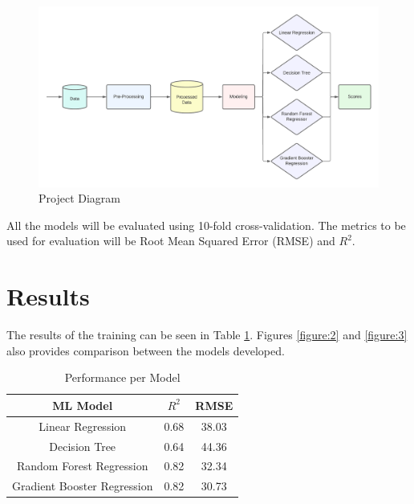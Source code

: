 \documentclass{article}
\begin{document}
\begin{figure}[h]
    \centering
    \includegraphics[width=\textwidth]{ProjectDiagram.png}
    \caption{Project Diagram}
    \label{figure:1}
\end{figure}

All the models will be evaluated using 10-fold cross-validation. The metrics to be used
for evaluation will be Root Mean Squared Error (RMSE) and \(R^2\).

\section{Results}

The results of the training can be seen in Table \ref{table:2}. Figures
\ref{figure:2} and \ref{figure:3} also provides comparison between the models developed.

\begin{table}[h]
    \centering
    \begin{tabular}{ | c | c | c |}
        \hline
        ML Model & \(R^2\) & RMSE \\
        \hline
        \hline
        Linear Regression & 0.68 & 38.03 \\
        \hline
        Decision Tree & 0.64 & 44.36 \\
        \hline
        Random Forest Regression & 0.82 & 32.34 \\
        \hline
        Gradient Booster Regression & 0.82 & 30.73 \\
        \hline
    \end{tabular}
    \caption{Performance per Model}
    \label{table:2}
\end{table}
\end{document}
